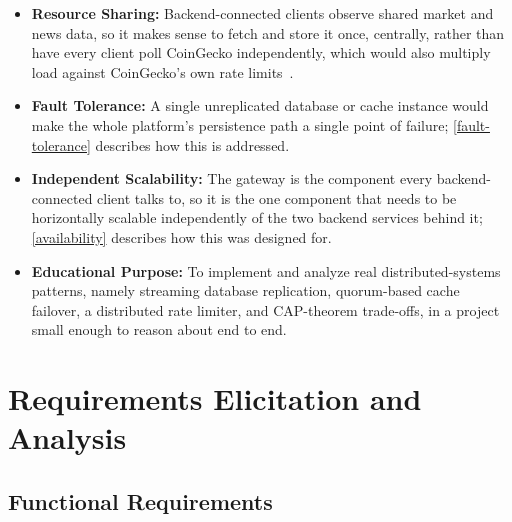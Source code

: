 \documentclass{scrartcl}
\begin{document}
\begin{itemize}
  \item \textbf{Resource Sharing:} Backend-connected clients observe shared market and news data, so it makes
  sense to fetch and store it once, centrally, rather than have every client poll CoinGecko
  independently, which would also multiply load against CoinGecko's own rate
  limits~\citep{coingecko2024api}.
  \item \textbf{Fault Tolerance:} A single unreplicated database or cache instance would make the
  whole platform's persistence path a single point of failure; \cref{fault-tolerance} describes
  how this is addressed.
  \item \textbf{Independent Scalability:} The gateway is the component every backend-connected client talks to,
  so it is the one component that needs to be horizontally scalable independently of the two
  backend services behind it; \cref{availability} describes how this was designed for.
  \item \textbf{Educational Purpose:} To implement and analyze real distributed-systems patterns,
  namely streaming database replication, quorum-based cache failover, a distributed rate limiter,
  and CAP-theorem trade-offs, in a project small enough to reason about end to end.
\end{itemize}

\section{Requirements Elicitation and Analysis}\label{requirements}

\subsection{Functional Requirements}\label{functional-requirements}
\end{document}
